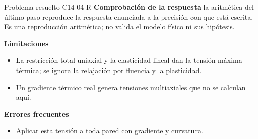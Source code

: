 \documentclass[10pt,openany]{book}
\begin{document}
\begin{studiumworked}{Problema resuelto C14-04-R}
\noindent\textbf{Comprobación de la respuesta} la aritmética del último paso reproduce la respuesta enunciada a la precisión con que está escrita. Es una reproducción aritmética; no valida el modelo físico ni sus hipótesis.

\noindent\textbf{Limitaciones}
\begin{itemize}
\item La restricción total uniaxial y la elasticidad lineal dan la tensión máxima térmica; se ignora la relajación por fluencia y la plasticidad.
\item Un gradiente térmico real genera tensiones multiaxiales que no se calculan aquí.
\end{itemize}

\noindent\textbf{Errores frecuentes}
\begin{itemize}
\item Aplicar esta tensión a toda pared con gradiente y curvatura.
\end{itemize}
\end{studiumworked}
\end{document}
